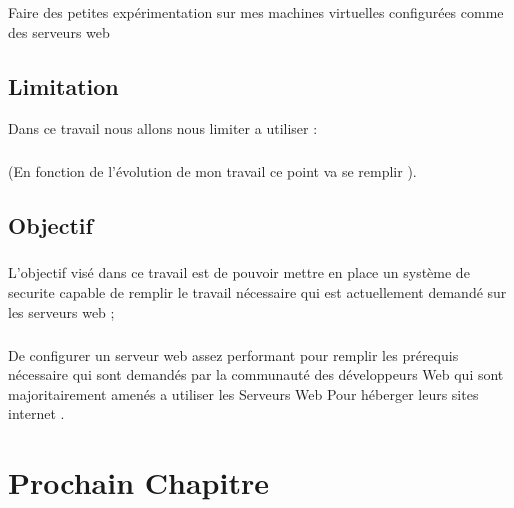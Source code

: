 \documentclass{report}
\begin{document}
  \paragraph{ }
  Faire des petites expérimentation sur mes machines virtuelles configurées comme des serveurs web  
  \section{Limitation}
  Dans ce travail nous allons nous limiter a utiliser :
  \paragraph{ } (En fonction de l’évolution de mon travail ce point va se remplir ).
  \section{Objectif}
  
  \paragraph{ }L'objectif visé  dans ce travail est de pouvoir mettre en place un système de securite capable de remplir le travail nécessaire qui est actuellement demandé  sur les serveurs web ;
  \paragraph{ } De configurer un serveur web assez performant pour remplir les prérequis    nécessaire qui sont demandés par la communauté  des développeurs   Web qui sont majoritairement amenés a utiliser les Serveurs Web Pour héberger leurs sites internet  .
  
   \chapter{Prochain Chapitre}
    
\end{document}
